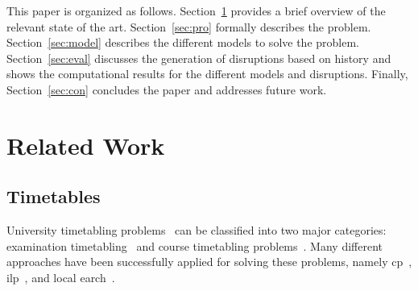 \documentclass[runningheads]{llncs}
\begin{document}

This paper is organized as follows. Section~\ref{sec:rel} provides a brief overview of the relevant state of the art. Section~\ref{sec:pro} formally describes the problem. Section~\ref{sec:model} describes the different models to solve the problem.  Section~\ref{sec:eval}  discusses the generation of disruptions based on history and shows the computational results for the different models and disruptions. Finally, Section~\ref{sec:con} concludes the paper and addresses future work.


\section{Related Work}\label{sec:rel}
\subsection{Timetables}
University timetabling problems~\cite{di2007second,DBLP:conf/wea/LachL08,DBLP:conf/patat/MullerRB04,DBLP:journals/eor/VermuytenLMB16}  can be classified into two major categories: examination timetabling~\cite{M2009} and course timetabling problems~\cite{di2007second}. Many different approaches have been successfully applied for solving these problems, namely  \gls{cp}~\cite{DBLP:conf/patat/MullerRB04}, \gls{ilp}~\cite{LINDAHL2019,DBLP:journals/eor/VermuytenLMB16}, and local earch~\cite{DBLP:conf/patat/grasp}. 
\end{document}
